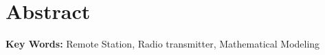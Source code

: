 \thispagestyle{plain}
\chapter*{Abstract}

\lipsum[1-3]

\textbf{Key Words:} Remote Station, 
Radio transmitter, 
Mathematical Modeling

